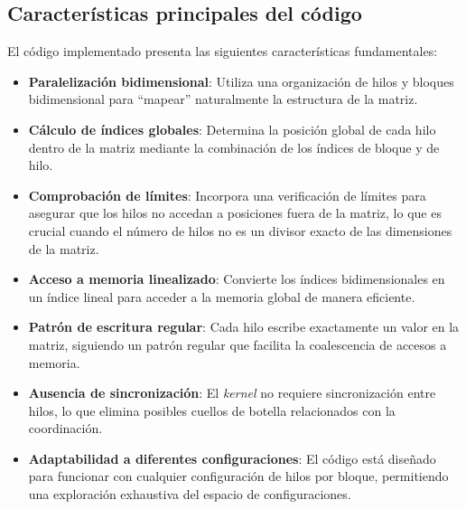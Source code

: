     \subsection{Características principales del código}

        El código implementado presenta las siguientes características fundamentales:
        
        \begin{itemize}

            \item \textbf{Paralelización bidimensional}: Utiliza una organización de hilos y bloques bidimensional para ``mapear'' naturalmente la estructura de la matriz.
            
            \item \textbf{Cálculo de índices globales}: Determina la posición global de cada hilo dentro de la matriz mediante la combinación de los índices de bloque y de hilo.

            \item \textbf{Comprobación de límites}: Incorpora una verificación de límites para asegurar que los hilos no accedan a posiciones fuera de la matriz, lo que es crucial cuando el número de hilos no es un divisor exacto de las dimensiones de la matriz.
            
            \item \textbf{Acceso a memoria linealizado}: Convierte los índices bidimensionales en un índice lineal para acceder a la memoria global de manera eficiente.
            
            \item \textbf{Patrón de escritura regular}: Cada hilo escribe exactamente un valor en la matriz, siguiendo un patrón regular que facilita la coalescencia de accesos a memoria.
            
            \item \textbf{Ausencia de sincronización}: El \textit{kernel} no requiere sincronización entre hilos, lo que elimina posibles cuellos de botella relacionados con la coordinación.
            
            \item \textbf{Adaptabilidad a diferentes configuraciones}: El código está diseñado para funcionar con cualquier configuración de hilos por bloque, permitiendo una exploración exhaustiva del espacio de configuraciones.
            
        \end{itemize}
        
